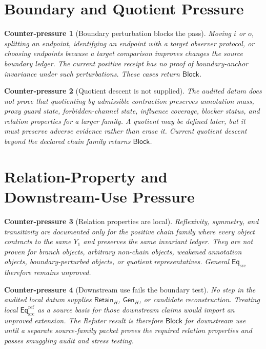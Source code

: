 \documentclass[11pt]{article}
\newcommand{\EqSrc}{\mathsf{Eq}_{\mathrm{src}}}
\newcommand{\EqRef}{\mathsf{Eq}_{\mathrm{src}}^{\mathrm{ref}}}
\newcommand{\RetainH}{\mathsf{Retain}_{H}}
\newcommand{\GenH}{\mathsf{Gen}_{H}}
\newcommand{\Block}{\mathsf{Block}}
\newtheorem{counterpressure}{Counter-pressure}
\begin{document}
\section{Boundary and Quotient Pressure}

\begin{counterpressure}[Boundary perturbation blocks the pass]
Moving \(i\) or \(o\), splitting an endpoint, identifying an endpoint
with a target observer protocol, or choosing endpoints because a target
comparison improves changes the source boundary ledger. The current
positive receipt has no proof of boundary-anchor invariance under such
perturbations. These cases return \(\Block\).
\end{counterpressure}

\begin{counterpressure}[Quotient descent is not supplied]
The audited datum does not prove that quotienting by admissible
contraction preserves annotation mass, proxy guard state,
forbidden-channel state, influence coverage, blocker status, and
relation properties for a larger family. A quotient may be defined later,
but it must preserve adverse evidence rather than erase it. Current
quotient descent beyond the declared chain family returns \(\Block\).
\end{counterpressure}

\section{Relation-Property and Downstream-Use Pressure}

\begin{counterpressure}[Relation properties are local]
Reflexivity, symmetry, and transitivity are documented only for the
positive chain family where every object contracts to the same \(Y_{1}\)
and preserves the same invariant ledger. They are not proven for branch
objects, arbitrary non-chain objects, weakened annotation objects,
boundary-perturbed objects, or quotient representatives. General
\(\EqSrc\) therefore remains unproved.
\end{counterpressure}

\begin{counterpressure}[Downstream use fails the boundary test]
No step in the audited local datum supplies \(\RetainH\), \(\GenH\), or
candidate reconstruction. Treating local \(\EqRef\) as a source basis for
those downstream claims would import an unproved extension. The Refuter
result is therefore \(\Block\) for downstream use until a separate
source-family packet proves the required relation properties and passes
smuggling audit and stress testing.
\end{counterpressure}
\end{document}
